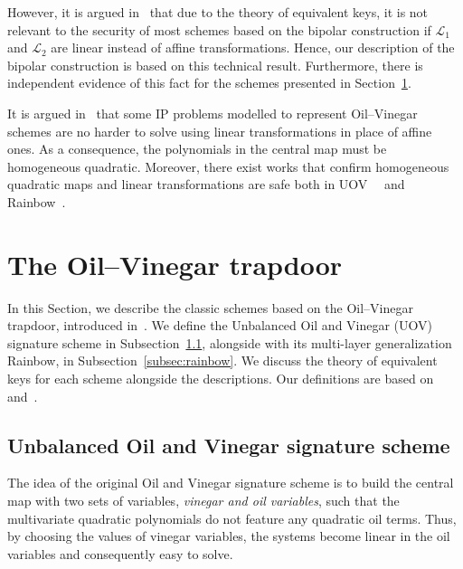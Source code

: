 \documentclass[draft, 12pt, a4paper, oneside]{memoir}
\theoremstyle{definition}
\begin{document}
However, it is argued in~\cite[Remark 3.1]{Wolf:201104} that due to the theory of equivalent keys, it is not relevant to the security of most schemes based on the bipolar construction if $\mathcal{L}_{1}$ and $\mathcal{L}_{2}$ are linear instead of affine transformations. Hence, our description of the bipolar construction is based on this technical result. Furthermore, there is independent evidence of this fact for the schemes presented in Section~\ref{sec:ov}. 

It is argued in~\cite[Lemmata 3.2, 3.10, 3.19]{Thomae:201306} that some IP problems modelled to represent Oil--Vinegar schemes are no harder to solve using linear transformations in place of affine ones. As a consequence, the polynomials in the central map must be homogeneous quadratic. Moreover, there exist works that confirm homogeneous quadratic maps and linear transformations are safe both in UOV~\cite[Section 5]{Kipnis:199808}~\cite[Section 3.1]{Braeken:200502} and Rainbow~\cite[Section 3.1]{Ding:201901}.

\section{The Oil--Vinegar trapdoor}\label{sec:ov}

In this Section, we describe the classic schemes based on the Oil--Vinegar trapdoor, introduced in~\cite{Patarin:199709}. We define the Unbalanced Oil and Vinegar (UOV) signature scheme in Subsection~\ref{subsec:uov}, alongside with its multi-layer generalization Rainbow, in Subsection~\ref{subsec:rainbow}. We discuss the theory of equivalent keys for each scheme alongside the descriptions. Our definitions are based on~\cite[Chapter 3]{Ding:2006} and~\cite[Chapter 3]{Petzoldt:201307}.

\subsection{Unbalanced Oil and Vinegar signature scheme}\label{subsec:uov}

The idea of the original Oil and Vinegar signature scheme is to build the central map with two sets of variables, \emph{vinegar and oil variables}, such that the multivariate quadratic polynomials do not feature any quadratic oil terms. Thus, by choosing the values of vinegar variables, the systems become linear in the oil variables and consequently easy to solve.
\end{document}
